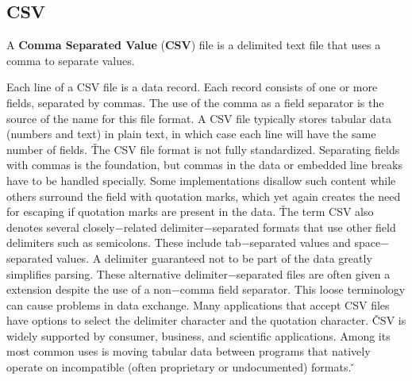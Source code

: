 \subsection{CSV}

A \textbf{Comma Separated Value} (\textbf{CSV}) file is a delimited text file that uses a comma to separate values.
\ed

Each line of a CSV file is a data record. Each record consists of one or more fields, separated by commas. The use of
the comma as a field separator is the source of the name for this file format. A CSV file typically stores tabular
data (numbers and text) in plain text, in which case each line will have the same number of fields. \v

The CSV file format is not fully standardized. Separating fields with commas is the foundation, but commas in the
data or embedded line breaks have to be handled specially. Some implementations disallow such content while others
surround the field with quotation marks, which yet again creates the need for escaping if quotation marks are present
in the data. \v

The term CSV also denotes several closely$-$related delimiter$-$separated formats that use other field delimiters
such as semicolons. These include tab$-$separated values and space$-$separated values. A delimiter guaranteed not to
be part of the data greatly simplifies parsing. These alternative delimiter$-$separated files are often given a
 extension despite the use of a non$-$comma field separator. This loose terminology can cause problems in
data exchange. Many applications that accept CSV files have options to select the delimiter character and the
quotation character. \v

CSV is widely supported by consumer, business, and scientific applications. Among its most common uses is moving
tabular data between programs that natively operate on incompatible (often proprietary or undocumented) formats. \v

